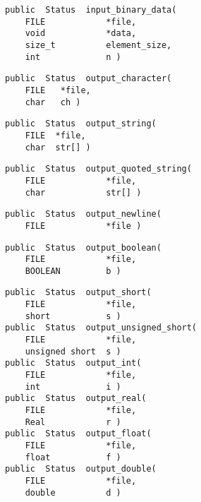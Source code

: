 {\bf\begin{verbatim}
public  Status  input_binary_data(
    FILE            *file,
    void            *data,
    size_t          element_size,
    int             n )
\end{verbatim}}


{\bf\begin{verbatim}
public  Status  output_character(
    FILE   *file,
    char   ch )
\end{verbatim}}


{\bf\begin{verbatim}
public  Status  output_string(
    FILE  *file,
    char  str[] )
\end{verbatim}}


{\bf\begin{verbatim}
public  Status  output_quoted_string(
    FILE            *file,
    char            str[] )
\end{verbatim}}


{\bf\begin{verbatim}
public  Status  output_newline(
    FILE            *file )
\end{verbatim}}


{\bf\begin{verbatim}
public  Status  output_boolean(
    FILE            *file,
    BOOLEAN         b )
\end{verbatim}}


{\bf\begin{verbatim}
public  Status  output_short(
    FILE            *file,
    short           s )
public  Status  output_unsigned_short(
    FILE            *file,
    unsigned short  s )
public  Status  output_int(
    FILE            *file,
    int             i )
public  Status  output_real(
    FILE            *file,
    Real            r )
public  Status  output_float(
    FILE            *file,
    float           f )
public  Status  output_double(
    FILE            *file,
    double          d )
\end{verbatim}}

